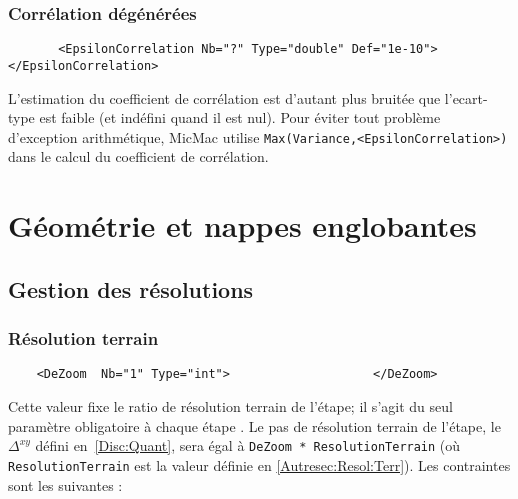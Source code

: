 
\subsubsection{Corr\'elation d\'eg\'en\'er\'ees}

\begin{verbatim}
       <EpsilonCorrelation Nb="?" Type="double" Def="1e-10"> </EpsilonCorrelation>
\end{verbatim}

L'estimation du coefficient de corr\'elation  est d'autant 
plus bruit\'ee  que l'ecart-type est faible (et ind\'efini
quand il est nul).  Pour \'eviter tout probl\`eme d'exception
arithm\'etique, MicMac utilise  {\tt Max(Variance,<EpsilonCorrelation>)}
dans le calcul du coefficient de corr\'elation.


\section{G\'eom\'etrie et  nappes englobantes}


\subsection{Gestion des r\'esolutions}

\subsubsection{R\'esolution terrain}
\begin{verbatim}
    <DeZoom  Nb="1" Type="int">                    </DeZoom>
\end{verbatim}

Cette valeur fixe le ratio de r\'esolution terrain de l'\'etape; 
il s'agit du seul param\`etre obligatoire \`a chaque \'etape .
Le pas de r\'esolution terrain de l'\'etape, le $\Delta^{xy}$ 
 d\'efini en~\ref{Disc:Quant},
sera \'egal \`a {\tt DeZoom * ResolutionTerrain} (o\`u
{\tt ResolutionTerrain} est la valeur d\'efinie en \ref{Autresec:Resol:Terr}).
 Les contraintes sont les suivantes :


